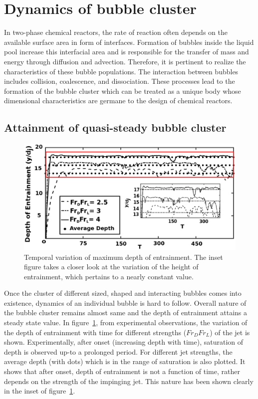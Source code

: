 \section{Dynamics of bubble cluster}
In two-phase chemical reactors, the rate of reaction often depends on the available surface area in form of interfaces. Formation of bubbles inside the liquid pool increase this interfacial area and is responsible for the transfer of mass and energy through diffusion and advection. Therefore, it is pertinent to realize the characteristics of these bubble populations. The interaction between bubbles includes collision, coalescence, and dissociation. These processes lead to the formation of the bubble cluster which can be treated as a unique body whose dimensional characteristics are germane to the design of chemical reactors.
\subsection{Attainment of quasi-steady bubble cluster}
\begin{figure}
	\centering
	\includegraphics[width=\linewidth]{chapters/jetPool/Figure12}
	\caption{Temporal variation of maximum depth of entrainment. The inset figure takes a closer look at the variation of the height of entrainment, which pertains to a nearly constant value.}
	\label{Figure::TemporalHeight}		
\end{figure}
Once the cluster of different sized, shaped and interacting bubbles comes into existence, dynamics of an individual bubble is hard to follow. Overall nature of the bubble cluster remains almost same and the depth of entrainment attains a steady state value. In figure~\ref{Figure::TemporalHeight}, from experimental observations, the variation of the depth of entrainment with time for different strengths ($Fr_DFr_L$) of the jet is shown. Experimentally, after onset (increasing depth with time), saturation of depth is observed up-to a prolonged period. For different jet strengths, the average depth (with dots) which is in the range of saturation is also plotted. It shows that after onset, depth of entrainment is not a function of time, rather depends on the strength of the impinging jet. This nature has been shown clearly in the inset of figure~\ref{Figure::TemporalHeight}.

